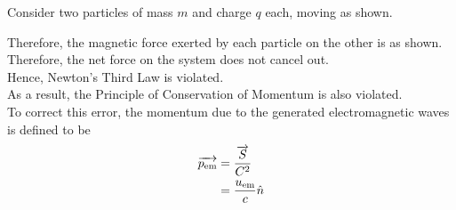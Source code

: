 \documentclass[fleqn, a4paper, 12pt, twoside]{article}
\theoremstyle{definition}
\theoremstyle{theorem}
\begin{document}
Consider two particles of mass $m$ and charge $q$ each, moving as shown.
\begin{figure}[H]
\end{figure}
Therefore, the magnetic force exerted by each particle on the other is as shown.\\
Therefore, the net force on the system does not cancel out.\\
Hence, Newton's Third Law is violated.\\
As a result, the Principle of Conservation of Momentum is also violated.\\
To correct this error, the momentum due to the generated electromagnetic waves is defined to be
\begin{align*}
	\overrightarrow{p_{\textnormal{em}}} &= \frac{\overrightarrow{S}}{C^2}\\
	&= \frac{u_{\textnormal{em}}}{c} \hat{n}
\end{align*}
\end{document}

